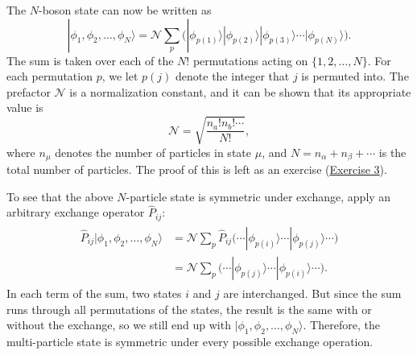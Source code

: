 \documentclass[pra,12pt]{revtex4}
\begin{document}
The $N$-boson state can now be written as
\begin{equation}
  |\phi_1,\phi_2,\dots,\phi_N\rangle = \mathcal{N} \sum_p \Big(|\phi_{p(1)}\rangle  |\phi_{p(2)}\rangle  |\phi_{p(3)}\rangle  \cdots  |\phi_{p(N)}\rangle\Big).
\end{equation}
The sum is taken over each of the $N!$ permutations acting on
$\{1,2,\dots,N\}$.  For each permutation $p$, we let $p(j)$ denote the
integer that $j$ is permuted into.  The prefactor $\mathcal{N}$ is a
normalization constant, and it can be shown that its appropriate value
is
\begin{equation}
  \mathcal{N} = \sqrt{\frac{n_a!n_b!\cdots}{N!}},
\end{equation}
where $n_\mu$ denotes the number of particles in state $\mu$, and $N =
n_\alpha + n_\beta + \cdots$ is the total number of particles.  The proof of
this is left as an exercise (\hyperref[ex:boson_norm]{Exercise 3}).

To see that the above $N$-particle state is symmetric under exchange,
apply an arbitrary exchange operator $\hat{P}_{ij}$:
\begin{align}
  \begin{aligned}\hat{P}_{ij}|\phi_1,\phi_2,\dots,\phi_N\rangle &= \mathcal{N} \sum_p \hat{P}_{ij} \Big(\cdots  |\phi_{p(i)}\rangle  \cdots  |\phi_{p(j)}\rangle\cdots\Big) \\&= \mathcal{N} \sum_p \Big(\cdots  |\phi_{p(j)}\rangle  \cdots  |\phi_{p(i)}\rangle\cdots\Big).\end{aligned}
\end{align}
In each term of the sum, two states $i$ and $j$ are interchanged.  But
since the sum runs through all permutations of the states, the result
is the same with or without the exchange, so we still end up with
$|\phi_1,\phi_2,\dots,\phi_N\rangle$.  Therefore, the multi-particle
state is symmetric under every possible exchange operation.
\end{document}

